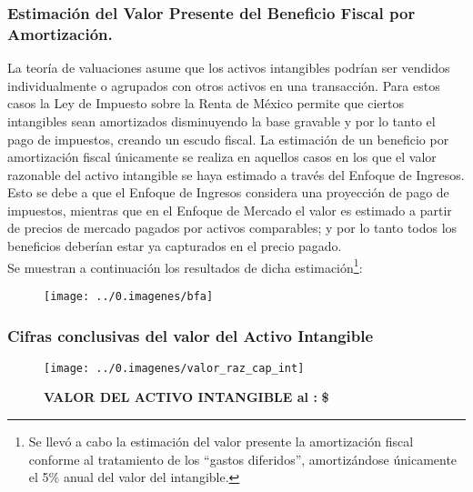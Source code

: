 \subsubsection{Estimación del Valor Presente del Beneficio Fiscal por Amortización.}

 La teoría de valuaciones asume que los activos intangibles podrían ser vendidos individualmente o agrupados con otros activos en una transacción. Para estos casos la Ley de Impuesto sobre la Renta de México permite que ciertos intangibles sean amortizados disminuyendo la base gravable y por lo tanto el pago de impuestos, creando un escudo fiscal. La estimación de un beneficio por amortización fiscal únicamente se realiza en aquellos casos en los que el valor razonable del activo intangible se haya estimado a través del Enfoque de Ingresos. Esto se debe a que el Enfoque de Ingresos considera una proyección de pago de impuestos, mientras que en el Enfoque de Mercado el valor es estimado a partir de precios de mercado pagados por activos comparables; y por lo tanto todos los beneficios deberían estar ya capturados en el precio pagado.\\

Se muestran a continuación los resultados de dicha estimación\footnote{Se llevó a cabo la estimación del valor presente la amortización fiscal conforme al tratamiento de los ``gastos diferidos'', amortizándose únicamente el 5\% anual del valor del intangible.}:


\begin{figure}[H]
\centering
\texttt{[image: ../0.imagenes/bfa]}
\end{figure}

\subsubsection{Cifras conclusivas del valor del Activo Intangible}

\begin{figure}[H]
\centering
	\texttt{[image: ../0.imagenes/valor\_raz\_cap\_int]}


\textcolor{principal}{\textbf{VALOR DEL ACTIVO INTANGIBLE al \fechaValoresCorto:}} \textbf{\$\valorCapitalIntangible{} \monedaCode} 

\end{figure}
